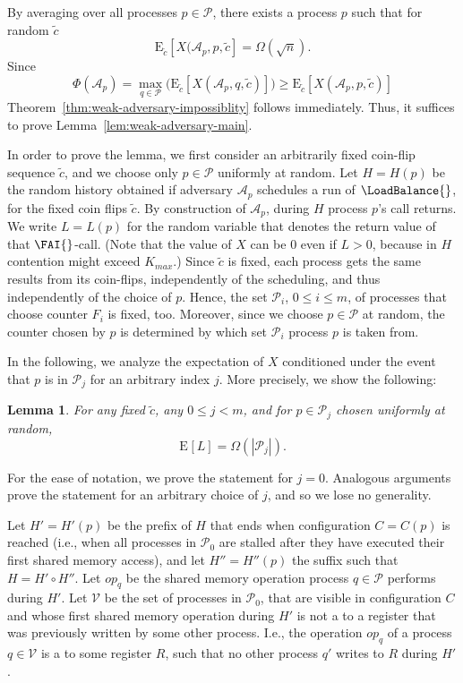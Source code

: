 \documentclass[11pt,letterpaper]{article}
\makeatletter
\providecommand{\@Exp}{{\mathrm{E}}}
\newcommand{\Exp}[2][]{\@Exp_{#1}\left[{#2}\right]}
\newcommand{\xwrite}{\text{\tt write}\xspace}
\newtheorem{lemma}[theorem]{Lemma}
\renewcommand{\AA}{\mathcal{A}}
\newcommand{\PP}{\mathcal{P}}
\newcommand{\VV}{\mathcal{V}}
\newcommand{\tc}{{\tilde{c}}}
\newcommand{\op}{\ensuremath{\mathit{op}}}
\makeatother
\begin{document}
\noindent By averaging over all processes $p\in\PP$, there exists a process $p$ such that for random $\tc$
\begin{equation}\label{eq:weak_after_averaging}
  \Exp[\tc]{X(\AA_p,p,\tc}=\Omega(\sqrt{n}).
\end{equation}
Since
\begin{displaymath}
 \Phi(\AA_p)=\max_{q\in\PP}\bigl(\Exp[\tc]{X(\AA_p,q,\tc)}\bigr)\geq\Exp[\tc]{X(\AA_p,p,\tc)}
\end{displaymath}
Theorem~\ref{thm:weak-adversary-impossiblity} follows immediately.
Thus, it suffices to prove Lemma~\ref{lem:weak-adversary-main}.

In order to prove the lemma, we first consider an arbitrarily fixed coin-flip sequence $\tc$, and we choose only $p\in\PP$ uniformly at random.
Let $H=H(p)$ be the random history obtained if adversary $\AA_p$ schedules a run of $\LoadBalance{}$, for the fixed coin flips $\tc$.
By construction of $\AA_p$, during $H$ process $p$'s \FAI{} call returns.
We write $L=L(p)$ for the random variable that denotes the return value of that $\FAI{}$-call.
(Note that the value of $X$ can be 0 even if $L>0$, because in $H$ contention might exceed $K_{max}$.)
Since $\tc$ is fixed, each process gets the same results from its coin-flips, independently of the scheduling, and thus independently of the choice of $p$.
Hence, the set $\PP_i$, $0\leq i\leq m$, of processes that choose counter $F_i$ is fixed, too.
Moreover, since we choose $p\in\PP$ at random, the counter chosen by $p$ is determined by which set $\PP_i$ process $p$ is taken from.

In the following, we analyze the expectation of $X$ conditioned under the event that $p$ is in $\PP_{j}$ for an arbitrary index $j$.
More precisely, we show the following:
\begin{lemma}\label{lem:L_vs_Pj}
  For any fixed $\tc$, any $0\leq j<m$, and for $p\in\PP_j$ chosen uniformly at random,
  \begin{displaymath}
  \Exp{L}=\Omega(|\PP_j|).
  \end{displaymath}
\end{lemma}
For the ease of notation, we prove the statement for $j=0$.
Analogous arguments prove the statement for an arbitrary choice of $j$,
  and so we lose no generality.

Let $H'=H'(p)$ be the prefix of $H$ that ends when configuration $C=C(p)$ is reached (i.e., when all processes in $\PP_0$ are stalled after they have executed their first shared memory access), and let $H''=H''(p)$ the suffix such that $H=H'\circ H''$.
Let $\op_q$ be the shared memory operation process $q\in\PP$ performs during $H'$.
Let $\VV$ be the set of processes in $\PP_{0}$, that are visible in configuration $C$ and whose first shared memory operation during $H'$ is not a \xwrite to a register that was previously written by some other process.
I.e., the operation $\op_q$ of a process $q\in\VV$ is a \xwrite to some register $R$, such that no other process $q'$ writes to $R$ during $H'$.
\end{document}
